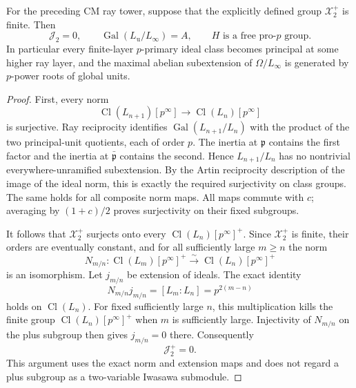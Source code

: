 \begin{proposition}\label{prop:cm-finite-plus-free}
For the preceding CM ray tower, suppose that the explicitly
defined group \(\mathcal X_2^+\) is finite.
Then
\[
 \mathcal J_2=0,\qquad
 \operatorname{Gal}(L_{\mathrm u}/L_\infty)=A,
 \qquad H\text{ is a free pro-}p\text{ group}.
\]
In particular every finite-layer \(p\)-primary ideal class becomes principal
at some higher ray layer, and the maximal abelian subextension
of \(\Omega/L_\infty\) is generated by \(p\)-power roots of
global units.
\end{proposition}

\begin{proof}
First, every norm
\[
 \operatorname{Cl}(L_{n+1})[p^\infty]
           \longrightarrow\operatorname{Cl}(L_n)[p^\infty]
\]
is surjective.
Ray reciprocity identifies
\(\operatorname{Gal}(L_{n+1}/L_n)\) with the product of the
two principal-unit quotients, each of order \(p\).
The inertia at \(\mathfrak p\) contains the first factor and
the inertia at \(\bar{\mathfrak p}\) contains the second.
Hence \(L_{n+1}/L_n\) has no nontrivial everywhere-unramified
subextension.
By the Artin reciprocity description of the image of the ideal
norm, this is exactly the required surjectivity on class groups.
The same holds for all composite norm maps.
All maps commute with \(c\); averaging by \((1+c)/2\) proves
surjectivity on their fixed subgroups.

It follows that \(\mathcal X_2^+\) surjects onto every
\(\operatorname{Cl}(L_n)[p^\infty]^+\).
Since \(\mathcal X_2^+\) is finite, their orders are eventually
constant, and for all sufficiently large \(m\geq n\) the norm
\[
 N_{m/n}:\operatorname{Cl}(L_m)[p^\infty]^+
                       \xrightarrow{\sim}
                         \operatorname{Cl}(L_n)[p^\infty]^+
\]
is an isomorphism.
Let \(j_{m/n}\) be extension of ideals.
The exact identity
\[
                  N_{m/n}j_{m/n}=[L_m:L_n]
                               =p^{2(m-n)}
\]
holds on \(\operatorname{Cl}(L_n)\).
For fixed sufficiently large \(n\), this multiplication kills
the finite group \(\operatorname{Cl}(L_n)[p^\infty]^+\) when
\(m\) is sufficiently large.
Injectivity of \(N_{m/n}\) on the plus subgroup then gives
\(j_{m/n}=0\) there.
Consequently
\begin{equation}\label{eq:cm-direct-limit-plus-zero}
                         \mathcal J_2^+=0.
\end{equation}
This argument uses the exact norm and extension maps and does not
regard a plus subgroup as a two-variable Iwasawa submodule.


\end{proof}
